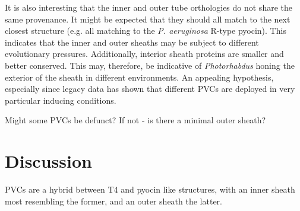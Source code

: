 
It is also interesting that the inner and outer tube orthologies do not share the same provenance. It might be expected that they should all match to the next closest structure (e.g. all matching to the \emph{P. aeruginosa} R-type pyocin). This indicates that the inner and outer sheaths may be subject to different evolutionary pressures. Additionally, interior sheath proteins are smaller and better conserved. This may, therefore, be indicative of \emph{Photorhabdus} honing the exterior of the sheath in different environments. An appealing hypothesis, especially since legacy data has shown that different PVCs are deployed in very particular inducing conditions.




Might some PVCs be defunct? If not - is there a minimal outer sheath?





















\section{Discussion}
PVCs are a hybrid between T4 and pyocin like structures, with an inner sheath most resembling the former, and an outer sheath the latter.








